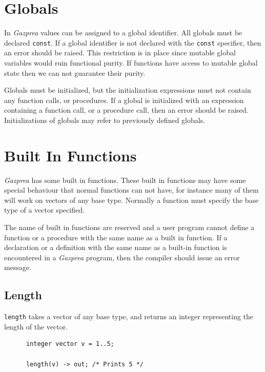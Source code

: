 \documentclass{article}
\begin{document}
\section{Globals}\label{sec:global}
  In \textit{Gazprea} values can be assigned to a global identifier. All globals must be declared \texttt{const}. If a
  global identifier is not declared with the \texttt{const} specifier, then an error should be raised. This
  restriction is in place since mutable global variables would ruin functional purity. If functions have access to
  mutable global state then we can not guarantee their purity.

  Globals must be initialized, but the initialization expressions must not contain any function calls, or procedures.
  If a global is initialized with an expression containing a function call, or a procedure call, then an error should
  be raised. Initializations of globals may refer to previously defined globals.


\section{Built In Functions}\label{sec:builtIn}

  \textit{Gazprea} has some built in functions. These built in functions may have some special behaviour that normal
  functions can not have, for instance many of them will work on vectors of any base type. Normally a function must
  specify the base type of a vector specified.

  The name of built in functions are reserved and a user program cannot define a function or a procedure with the same
  name as a built in function. If a declaration or a definition with the same name as a built-in function is
  encountered in a \textit{Gazprea} program, then the compiler should issue an error message.

  \subsection{Length}\label{sec:length}

    \texttt{length} takes a vector of any base type, and returns an integer representing the length of the vector.

    \begin{lstlisting}
      integer vector v = 1..5;

      length(v) -> out; /* Prints 5 */
    \end{lstlisting}
\end{document}
